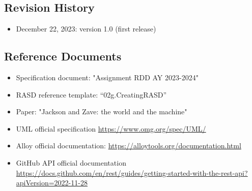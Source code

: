 \subsection{Revision History}
\begin{itemize}
    \item December 22, 2023: version 1.0 (first release)
\end{itemize}
\subsection{Reference Documents}
\begin{itemize}
    \item {Specification document: "Assignment RDD AY 2023-2024"}
    \item {RASD reference template: “02g.CreatingRASD”}
    \item {Paper: "Jackson and Zave: the world and the machine"}
    \item {UML official specification \href{https://www.omg.org/spec/UML/}{https://www.omg.org/spec/UML/}}
    \item {Alloy official documentation: \href{https://alloytools.org/documentation.html}{https://alloytools.org/documentation.html}}
\item {GitHub  API official documentation \href{https://docs.github.com/en/rest/guides/getting-started-with-the-rest-api?apiVersion=2022-11-28}{https://docs.github.com/en/rest/guides/getting-started-with-the-rest-api?apiVersion=2022-11-28}}
\end{itemize}

